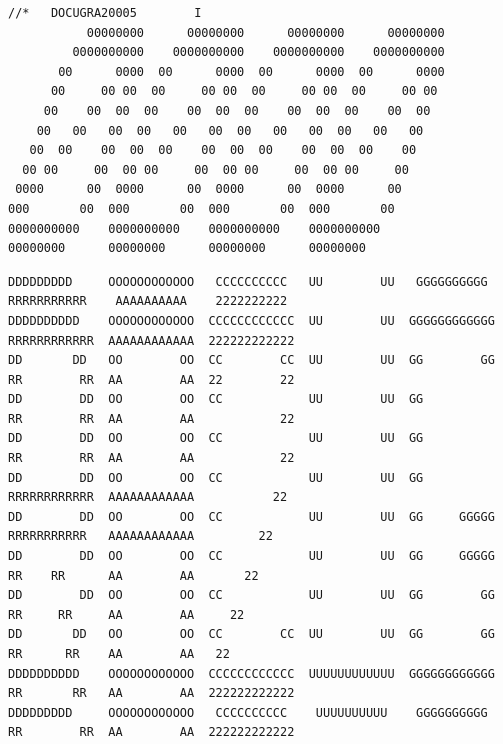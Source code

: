 {\fontsize{4}{5}\selectfont
\begin{verbatim}
//*   DOCUGRA20005        I
           00000000      00000000      00000000      00000000
         0000000000    0000000000    0000000000    0000000000
       00      0000  00      0000  00      0000  00      0000
      00     00 00  00     00 00  00     00 00  00     00 00
     00    00  00  00    00  00  00    00  00  00    00  00
    00   00   00  00   00   00  00   00   00  00   00   00
   00  00    00  00  00    00  00  00    00  00  00    00
  00 00     00  00 00     00  00 00     00  00 00     00
 0000      00  0000      00  0000      00  0000      00
000       00  000       00  000       00  000       00
0000000000    0000000000    0000000000    0000000000
00000000      00000000      00000000      00000000
\end{verbatim}
}

{\fontsize{4}{5}\selectfont
\begin{verbatim}
DDDDDDDDD     OOOOOOOOOOOO   CCCCCCCCCC   UU        UU   GGGGGGGGGG   RRRRRRRRRRR    AAAAAAAAAA    2222222222
DDDDDDDDDD    OOOOOOOOOOOO  CCCCCCCCCCCC  UU        UU  GGGGGGGGGGGG  RRRRRRRRRRRR  AAAAAAAAAAAA  222222222222
DD       DD   OO        OO  CC        CC  UU        UU  GG        GG  RR        RR  AA        AA  22        22
DD        DD  OO        OO  CC            UU        UU  GG            RR        RR  AA        AA            22
DD        DD  OO        OO  CC            UU        UU  GG            RR        RR  AA        AA            22
DD        DD  OO        OO  CC            UU        UU  GG            RRRRRRRRRRRR  AAAAAAAAAAAA           22
DD        DD  OO        OO  CC            UU        UU  GG     GGGGG  RRRRRRRRRRR   AAAAAAAAAAAA         22
DD        DD  OO        OO  CC            UU        UU  GG     GGGGG  RR    RR      AA        AA       22
DD        DD  OO        OO  CC            UU        UU  GG        GG  RR     RR     AA        AA     22
DD       DD   OO        OO  CC        CC  UU        UU  GG        GG  RR      RR    AA        AA   22
DDDDDDDDDD    OOOOOOOOOOOO  CCCCCCCCCCCC  UUUUUUUUUUUU  GGGGGGGGGGGG  RR       RR   AA        AA  222222222222
DDDDDDDDD     OOOOOOOOOOOO   CCCCCCCCCC    UUUUUUUUUU    GGGGGGGGGG   RR        RR  AA        AA  222222222222
\end{verbatim}
}

